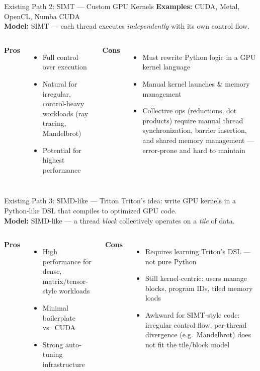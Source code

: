 \documentclass[aspectratio=169]{beamer}
\begin{document}
\begin{frame}{Existing Path 2: SIMT — Custom GPU Kernels}
  \textbf{Examples:} CUDA, Metal, OpenCL, Numba CUDA\\
  \textbf{Model:} SIMT — each thread executes \emph{independently} with its own control flow.
  \vspace{0.5em}

  \begin{columns}
    \textbf{Pros}
    \begin{itemize}
      \item Full control over execution
      \item Natural for irregular, control-heavy workloads (ray tracing, Mandelbrot)
      \item Potential for highest performance
    \end{itemize}

    \textbf{Cons}
    \begin{itemize}
      \item Must rewrite Python logic in a GPU kernel language
      \item Manual kernel launches \& memory management
      \item Collective ops (reductions, dot products) require manual thread synchronization, barrier insertion, and shared memory management — error-prone and hard to maintain
    \end{itemize}
  \end{columns}
\end{frame}

\begin{frame}{Existing Path 3: SIMD-like — Triton}
  Triton's idea: write GPU kernels in a Python-like DSL that compiles to optimized GPU code.\\
  \textbf{Model:} SIMD-like — a thread \emph{block} collectively operates on a \emph{tile} of data.
  \vspace{0.5em}

  \begin{columns}
    \textbf{Pros}
    \begin{itemize}
      \item High performance for dense, matrix/tensor-style workloads
      \item Minimal boilerplate vs.\ CUDA
      \item Strong auto-tuning infrastructure
    \end{itemize}

    \textbf{Cons}
    \begin{itemize}
      \item Requires learning Triton's DSL — not pure Python
      \item Still kernel-centric: users manage blocks, program IDs, tiled memory loads
      \item Awkward for SIMT-style code: irregular control flow, per-thread divergence
            (e.g.\ Mandelbrot) does not fit the tile/block model
    \end{itemize}
  \end{columns}
\end{frame}
\end{document}
